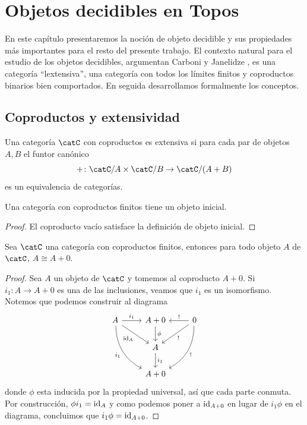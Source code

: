 \chapter{Objetos decidibles en Topos}

En este capítulo presentaremos la noción de objeto decidible y sus propiedades
más importantes para el resto del presente trabajo. El contexto natural para el
estudio de los objetos decidibles, argumentan Carboni y Janelidze \cite{carboni1996decidable},
es una categoría ``lextensiva'', una categoría con todos los límites finitos y coproductos binarios bien comportados.
En seguida desarrollamos formalmente los conceptos.

\section{Coproductos y extensividad}

\begin{definition}
  Una categoría $\catC$ con coproductos es extensiva si para cada par de objetos $A,B$
  el funtor canónico
  \begin{equation*}
    +\colon\catC/A\times\catC/B \to \catC/(A+B)
  \end{equation*}
  es un equivalencia de categorías.
\end{definition}

\begin{proposition}[label=prop:coprovacio]
  Una categoría con coproductos finitos tiene un objeto inicial.
\end{proposition}
\begin{proof}
  El coproducto vacío satisface la definición de objeto inicial.
\end{proof}

\begin{proposition}[label=prop:amascero]
  Sea $\catC$ una categoría con coproductos finitos, entonces para todo objeto $A$ de $\catC$,
  $A\cong A+0$.
\end{proposition}
\begin{proof}
  Sea $A$ un objeto de $\catC$ y tomemos al coproducto $A+0$. Si $i_1\colon A\to A+0$ es una
  de las inclusiones, veamos que $i_1$ es un isomorfismo. Notemos que podemos construir al
  diagrama
  \begin{equation*}
    \begin{tikzcd}
      A\ar{r}{i_1}\ar[swap]{rd}{\id_A}\ar[bend right,swap]{rdd}{i_1} & A+0\ar{d}{\phi} & 0\ar[swap]{l}{!}\ar{ld}{!}\ar[bend left]{ldd}{!} \\
      & A\ar{d}{i_1} \\
      & A+0
    \end{tikzcd}
  \end{equation*}
  donde $\phi$ esta inducida por la propiedad universal, así que cada parte conmuta. Por
  construcción, $\phi i_1 = \operatorname{id}_A$ y como podemos poner a $\operatorname{id}_{A+0}$ en lugar de $i_1\phi$ en el diagrama,
  concluimos que $i_1\phi=\operatorname{id}_{A+0}$.
\end{proof}

